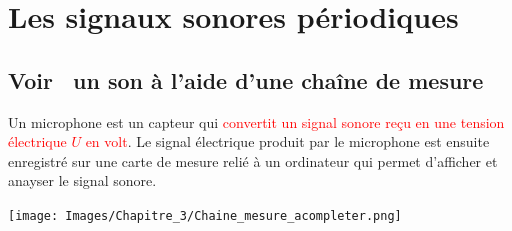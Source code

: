 
\section{Les signaux sonores périodiques}
\subsection{\og Voir \fg ~un son à l'aide d'une chaîne de mesure}
\begin{tcolorbox}[colback=green!5!white,colframe=green!75!black,title=\textbf{Microphone et enregistrement:}]
Un microphone est un capteur qui \textcolor{red}{convertit un signal sonore reçu en une tension électrique $U$ en volt}. Le signal électrique produit par le microphone est ensuite enregistré sur une carte de mesure relié à un ordinateur qui permet d'afficher et anayser le signal sonore.
\begin{center}
    \texttt{[image: Images/Chapitre\_3/Chaine\_mesure\_acompleter.png]}
\end{center}
\end{tcolorbox}
